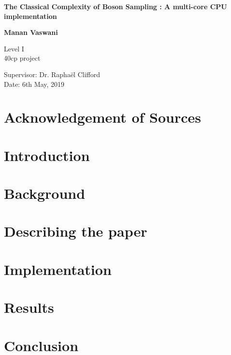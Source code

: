 \documentclass[11pt]{article}
\theoremstyle{theorem}
\theoremstyle{theorem}
\theoremstyle{remark}
\theoremstyle{note}
\theoremstyle{plain}
\theoremstyle{definition}
\begin{document}
\begin{titlepage}
    \begin{center}
        \vspace*{\fill}
        
        \Huge
        \textbf{The Classical Complexity of Boson Sampling : A multi-core CPU implementation}
        
        \LARGE
        
        \vspace{2cm}
        \textbf{Manan Vaswani}
        
        \vfill
        
        Level I\\
        40cp project
        
        \vspace{0.8cm}
        
        
        \Large
        Supervisor: Dr. Rapha\"el Clifford\\
	Date: 6th May, 2019
        
    \end{center}
\end{titlepage}

\newpage
\section*{Acknowledgement of Sources}

\newpage
\tableofcontents
\newpage
\section{Introduction} %


\section{Background} %


\section{Describing the paper} %

\section{Implementation} %

\section{Results}

\section{Conclusion}



\end{document}
